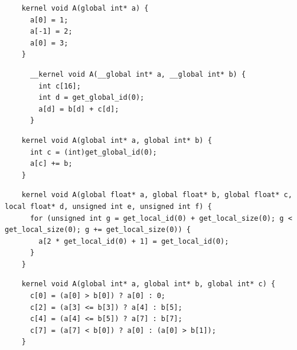\newsavebox{\XeonPhiInvalidWrite}
\begin{lrbox}{\XeonPhiInvalidWrite}
  \hspace{1.5em}
  \begin{lstlisting}
    kernel void A(global int* a) {
      a[0] = 1;
      a[-1] = 2;
      a[0] = 3;
    }
  \end{lstlisting}
\end{lrbox}

\newsavebox{\UninitRead}
\begin{lrbox}{\UninitRead}
  \hspace{1.5em}
  \begin{lstlisting}
      __kernel void A(__global int* a, __global int* b) {
        int c[16];
        int d = get_global_id(0);
        a[d] = b[d] + c[d];
      }
  \end{lstlisting}
\end{lrbox}

\newsavebox{\IntelPtrAssertion}
\begin{lrbox}{\IntelPtrAssertion}
  \hspace{1.5em}
  \begin{lstlisting}
    kernel void A(global int* a, global int* b) {
      int c = (int)get_global_id(0);
      a[c] += b;
    }
  \end{lstlisting}
\end{lrbox}

\newsavebox{\IntelScalarAssertion}
\begin{lrbox}{\IntelScalarAssertion}
  \hspace{1.5em}
  \begin{lstlisting}
    kernel void A(global float* a, global float* b, global float* c, local float* d, unsigned int e, unsigned int f) {
      for (unsigned int g = get_local_id(0) + get_local_size(0); g < get_local_size(0); g += get_local_size(0)) {
        a[2 * get_local_id(0) + 1] = get_local_id(0);
      }
    }
  \end{lstlisting}
\end{lrbox}

\newsavebox{\BeignetTernary}
\begin{lrbox}{\BeignetTernary}
  \hspace{1.5em}
  \begin{lstlisting}
    kernel void A(global int* a, global int* b, global int* c) {
      c[0] = (a[0] > b[0]) ? a[0] : 0;
      c[2] = (a[3] <= b[3]) ? a[4] : b[5];
      c[4] = (a[4] <= b[5]) ? a[7] : b[7];
      c[7] = (a[7] < b[0]) ? a[0] : (a[0] > b[1]);
    }
  \end{lstlisting}
\end{lrbox}
%

